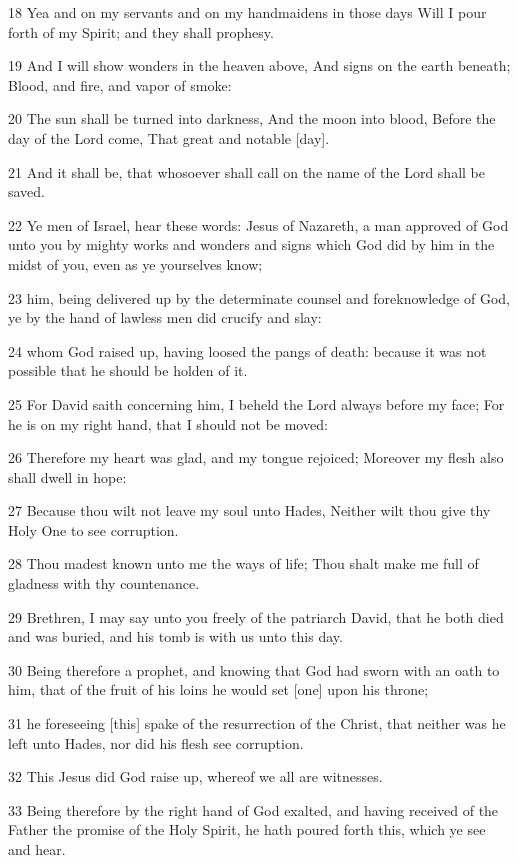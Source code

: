 \par 18 Yea and on my servants and on my handmaidens in those days Will I pour forth of my Spirit; and they shall prophesy.
\par 19 And I will show wonders in the heaven above, And signs on the earth beneath; Blood, and fire, and vapor of smoke:
\par 20 The sun shall be turned into darkness, And the moon into blood, Before the day of the Lord come, That great and notable [day].
\par 21 And it shall be, that whosoever shall call on the name of the Lord shall be saved.
\par 22 Ye men of Israel, hear these words: Jesus of Nazareth, a man approved of God unto you by mighty works and wonders and signs which God did by him in the midst of you, even as ye yourselves know;
\par 23 him, being delivered up by the determinate counsel and foreknowledge of God, ye by the hand of lawless men did crucify and slay:
\par 24 whom God raised up, having loosed the pangs of death: because it was not possible that he should be holden of it.
\par 25 For David saith concerning him, I beheld the Lord always before my face; For he is on my right hand, that I should not be moved:
\par 26 Therefore my heart was glad, and my tongue rejoiced; Moreover my flesh also shall dwell in hope:
\par 27 Because thou wilt not leave my soul unto Hades, Neither wilt thou give thy Holy One to see corruption.
\par 28 Thou madest known unto me the ways of life; Thou shalt make me full of gladness with thy countenance.
\par 29 Brethren, I may say unto you freely of the patriarch David, that he both died and was buried, and his tomb is with us unto this day.
\par 30 Being therefore a prophet, and knowing that God had sworn with an oath to him, that of the fruit of his loins he would set [one] upon his throne;
\par 31 he foreseeing [this] spake of the resurrection of the Christ, that neither was he left unto Hades, nor did his flesh see corruption.
\par 32 This Jesus did God raise up, whereof we all are witnesses.
\par 33 Being therefore by the right hand of God exalted, and having received of the Father the promise of the Holy Spirit, he hath poured forth this, which ye see and hear.
